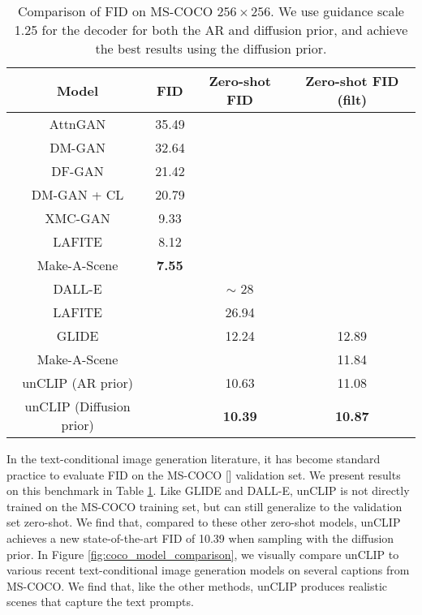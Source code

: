 \documentclass{article}
\newcommand{\shortcite}[1]{[\citenum{#1}]}
\newcommand{\modelname}{unCLIP}
\begin{document}
\begin{table}[t]
    \centering
    \begin{center}
    \begin{small}
    \begin{tabular}{cccc}
    \toprule
    Model & FID & Zero-shot FID & Zero-shot FID (filt) \\
    \midrule
    AttnGAN \citep{attngan} & 35.49 & & \\
    DM-GAN \citep{dmgan} & 32.64 & & \\
    DF-GAN \citep{dfgan} & 21.42 & & \\
    DM-GAN + CL \citep{textcl} & 20.79 & & \\
    XMC-GAN \citep{xmcgan} & 9.33 & & \\
    LAFITE \citep{lafite} & 8.12 & & \\
    Make-A-Scene \citep{makeascene} & \textbf{7.55} & & \\
    \midrule
    DALL-E \citep{dalle} & & $\sim$ 28 & \\
    LAFITE \citep{lafite} & & 26.94 & \\
    GLIDE \citep{glide} & & 12.24 & 12.89 \\
    Make-A-Scene \citep{makeascene} & & & 11.84 \\
    \modelname{} (AR prior) & & 10.63 & 11.08 \\
    \modelname{} (Diffusion prior) & & \textbf{10.39} & \textbf{10.87} \\
    \bottomrule
    \end{tabular}
    \end{small}
    \end{center}
    \caption{\label{tab:mscoco_fids} Comparison of FID on MS-COCO $256 \times 256$. We use guidance scale 1.25 for the decoder for both the AR and diffusion prior, and achieve the best results using the diffusion prior.}
    \vskip -0.2in
\end{table}

In the text-conditional image generation literature, it has become standard practice to evaluate FID on the MS-COCO \shortcite{mscoco} validation set. We present results on this benchmark in Table \ref{tab:mscoco_fids}. Like GLIDE and DALL-E, \modelname{} is not directly trained on the MS-COCO training set, but can still generalize to the validation set zero-shot. We find that, compared to these other zero-shot models, \modelname{} achieves a new state-of-the-art FID of 10.39 when sampling with the diffusion prior. In Figure \ref{fig:coco_model_comparison}, we visually compare \modelname{} to various recent text-conditional image generation models on several captions from MS-COCO. We find that, like the other methods, \modelname{} produces realistic scenes that capture the text prompts.
\end{document}
